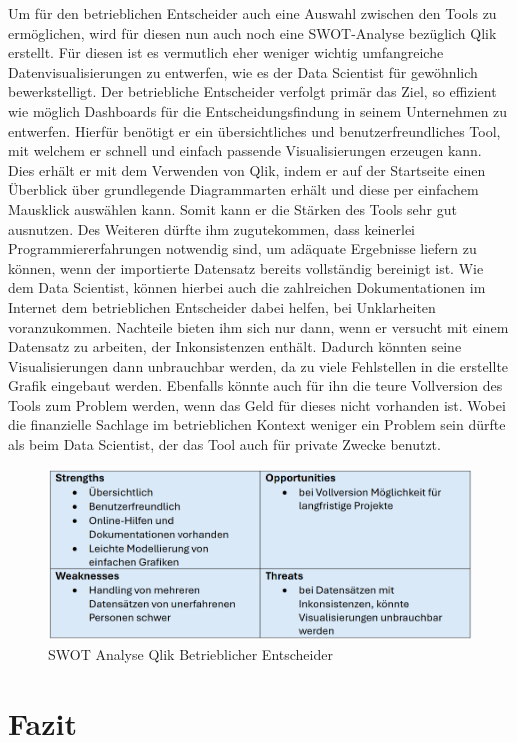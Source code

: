 \documentclass[12pt]{article}
\begin{document}
	Um für den betrieblichen Entscheider auch eine Auswahl zwischen den Tools zu
	ermöglichen, wird für diesen nun auch noch eine SWOT-Analyse bezüglich Qlik erstellt.
	Für diesen ist es vermutlich eher weniger wichtig umfangreiche Datenvisualisierungen
	zu entwerfen, wie es der Data Scientist für gewöhnlich bewerkstelligt. Der betriebliche
	Entscheider verfolgt primär das Ziel, so effizient wie möglich Dashboards für die
	Entscheidungsfindung in seinem Unternehmen zu entwerfen.
	Hierfür benötigt er ein übersichtliches und benutzerfreundliches Tool, mit welchem er
	schnell und einfach passende Visualisierungen erzeugen kann. Dies erhält er mit dem
	Verwenden von Qlik, indem er auf der Startseite einen Überblick über grundlegende
	Diagrammarten erhält und diese per einfachem Mausklick auswählen kann.
	Somit kann er die Stärken des Tools sehr gut ausnutzen.
	Des Weiteren dürfte ihm zugutekommen, dass keinerlei Programmiererfahrungen
	notwendig sind, um adäquate Ergebnisse liefern zu können, wenn der importierte
	Datensatz bereits vollständig bereinigt ist. Wie dem Data Scientist, können hierbei auch
	die zahlreichen Dokumentationen im Internet dem betrieblichen Entscheider dabei
	helfen, bei Unklarheiten voranzukommen.
	Nachteile bieten ihm sich nur dann, wenn er versucht mit einem Datensatz zu arbeiten,
	der Inkonsistenzen enthält. Dadurch könnten seine Visualisierungen dann unbrauchbar
	werden, da zu viele Fehlstellen in die erstellte Grafik eingebaut werden.
	Ebenfalls könnte auch für ihn die teure Vollversion des Tools zum Problem werden, wenn
	das Geld für dieses nicht vorhanden ist. Wobei die finanzielle Sachlage im betrieblichen
	Kontext weniger ein Problem sein dürfte als beim Data Scientist, der das Tool auch für
	private Zwecke benutzt.
	\begin{figure}[h]
		\centering
		\includegraphics[width=1.0\textwidth]{SWOT4}
		\caption{SWOT Analyse Qlik Betrieblicher Entscheider}
	\end{figure}
	
	\section{Fazit}
	
\end{document}
